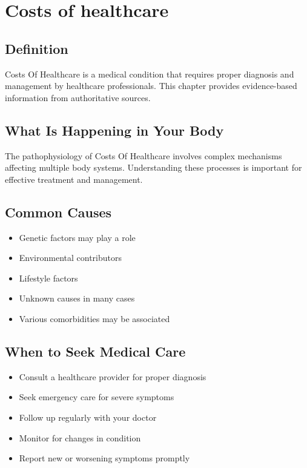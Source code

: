 
\chapter{Costs of healthcare}

\section*{Definition}
Costs Of Healthcare is a medical condition that requires proper diagnosis and management by healthcare professionals. This chapter provides evidence-based information from authoritative sources.

\section*{What Is Happening in Your Body}
The pathophysiology of Costs Of Healthcare involves complex mechanisms affecting multiple body systems. Understanding these processes is important for effective treatment and management.

\section*{Common Causes}
\begin{itemize}
  \item Genetic factors may play a role
  \item Environmental contributors
  \item Lifestyle factors
  \item Unknown causes in many cases
  \item Various comorbidities may be associated
\end{itemize}

\section*{When to Seek Medical Care}
\begin{itemize}
  \item Consult a healthcare provider for proper diagnosis
  \item Seek emergency care for severe symptoms
  \item Follow up regularly with your doctor
  \item Monitor for changes in condition
  \item Report new or worsening symptoms promptly
\end{itemize}

